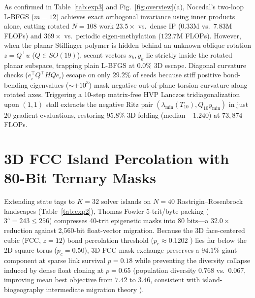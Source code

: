 \documentclass[10pt,twocolumn,letterpaper]{article}
\begin{document}
As confirmed in Table~\ref{tab:exp3} and Fig.~\ref{fig:overview}(a), Nocedal's two-loop L-BFGS \cite{Nocedal1980,Byrd1994} ($m=12$) achieves exact orthogonal invariance using inner products alone, cutting rotated $N=108$ work $23.5\times$ vs.\ dense IP ($0.33\text{M}$ vs.\ $7.83\text{M}$ FLOPs) and $369\times$ vs.\ periodic eigen-methylation ($122.7\text{M}$ FLOPs). However, when the planar Stillinger polymer is hidden behind an unknown oblique rotation $z = Q^\top u$ ($Q \in SO(19)$), secant vectors $s_k, y_k$ lie strictly inside the rotated planar subspace, trapping plain L-BFGS at $0.0\%$ 3D escape. Diagonal curvature checks ($e_i^\top Q^\top H Q e_i$) escape on only $29.2\%$ of seeds because stiff positive bond-bending eigenvalues ($\sim +10^3$) mask negative out-of-plane torsion curvature along rotated axes. Triggering a 10-step matrix-free HVP Lanczos tridiagonalization \cite{Lanczos1950} upon $(1,1)$ stall extracts the negative Ritz pair $(\lambda_{\min}(T_{10}), Q_{10} y_{\min})$ in just $20$ gradient evaluations, restoring $95.8\%$ 3D folding (median $-1.240$) at $73,874$ FLOPs.

\section{3D FCC Island Percolation with 80-Bit Ternary Masks}
Extending state tags to $K=32$ solver islands on $N=40$ Rastrigin--Rosenbrock landscapes (Table~\ref{tab:exp2}), Thomas Fowler 5-trit/byte packing ($3^5 = 243 \le 256$) compresses 40-trit epigenetic masks into $80\text{ bits}$—a $32.0\times$ reduction against 2,560-bit float-vector migration. Because the 3D face-centered cubic (FCC, $z=12$) bond percolation threshold ($p_c \approx 0.1202$ \cite{Lorenz1998}) lies far below the 2D square torus ($p_c = 0.50$), 3D FCC mask exchange preserves a $94.1\%$ giant component at sparse link survival $p=0.18$ while preventing the diversity collapse induced by dense float cloning at $p=0.65$ (population diversity $0.768$ vs.\ $0.067$, improving mean best objective from $7.42$ to $3.46$, consistent with island-biogeography intermediate migration theory \cite{Whitley1999}).

\begin{table}[!htbp]
\caption{Multi-agent archipelago topology \& migration protocol ($K=32, N=40, n=24$).}
\label{tab:exp2}
\vspace{2pt}
\end{table}
\end{document}
